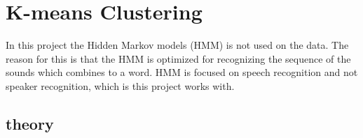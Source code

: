 \chapter{K-means Clustering}
In this project the Hidden Markov models (HMM) is not used on the data.
The reason for this is that the HMM is optimized for recognizing the sequence of the sounds which combines to a word.
HMM is focused on speech recognition and not speaker recognition, which is this project works with.



\section{theory}   